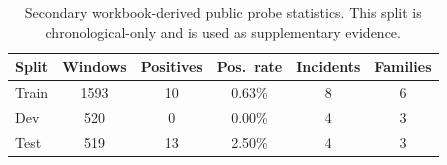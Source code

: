 \begin{table}[t]
\centering
\small
\setlength{\tabcolsep}{3.8pt}
\caption{Secondary workbook-derived public probe statistics. This split is chronological-only and is used as supplementary evidence.}
\label{tab:atlasv2-workbook-stats}
\begin{tabular}{lccccc}
\toprule
Split & Windows & Positives & Pos.\ rate & Incidents & Families \\
\midrule
Train & 1593 & 10 & 0.63\% & 8 & 6 \\
Dev & 520 & 0 & 0.00\% & 4 & 3 \\
Test & 519 & 13 & 2.50\% & 4 & 3 \\
\bottomrule
\end{tabular}
\end{table}
